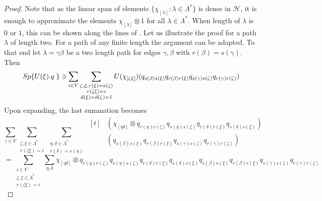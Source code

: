 \documentclass{amsart}
\theoremstyle{plain}
\theoremstyle{definition}
\theoremstyle{remark}
\numberwithin{equation}{section}
\newcommand{\cal}{\mathcal}
\newcommand{\clh}{{\cal H}}
\begin{document}
\begin{proof}
Note that as the linear span of elements $\{\chi_{[\lambda]}:\lambda\in\Lambda^{\ast}\}$ is dense in $\clh$, it is enough to approximate the elements $\chi_{[\lambda]}\otimes 1$ for all $\lambda\in\Lambda^{\ast}$. When length of $\lambda$ is $0$ or $1$, this can be shown along the lines of \cite{weber}.
 Let us illustrate the proof for a path $\lambda$ of length two. For a path of any finite length the argument can be adapted. To that end let $\lambda=\gamma\beta$ be a two length path for edges $\gamma,\beta$ with $r(\beta)=s(\gamma)$. Then 
\begin{equation*}
    {\rm Sp}\{U(\xi).q\;\}\ni  \sum\limits_{i \in V}\sum\limits_{\substack{\zeta,\xi,r(\xi)=s(\zeta) \\
    r(\zeta\xi)=i\\ d(\xi)=d(\zeta)=1}} U(\chi_{[\zeta\xi]})( q_{s(\beta)s(\xi)}q_{r(\beta)r(\xi)}q_{s(\gamma)s(\zeta)}q_{r(\gamma)r(\zeta)})
\end{equation*}
Upon expanding, the last summation becomes
\begin{equation*}
    \sum\limits_{i\in V}\sum\limits_{\substack{\zeta,\xi\in \Lambda^{\ast} \\
r(\zeta\xi)=i}}\sum\limits_{\substack{\eta,\delta\in \Lambda^{\ast} \\r(\delta)=s(\eta)}} 
\begin{aligned}[t]
&\left(\chi_{[\eta\delta]}\otimes 
q_{r(\eta)r(\zeta)}q_{s(\eta)s(\zeta)}q_{r(\delta)r(\xi)}q_{s(\delta)s(\xi)}\right) \\
&( q_{s(\beta)s(\xi)}q_{r(\beta)r(\xi)}q_{s(\gamma)s(\zeta)}q_{r(\gamma)r(\zeta)})
\end{aligned}
\end{equation*}
\begin{equation*}
    =\sum\limits_{\substack{i\in V \\ \zeta,\xi \in \Lambda^{\ast}\\
    r(\zeta\xi)=i}}\sum\limits_{\eta,\delta} \chi_{[\eta\delta]} \otimes 
q_{r(\eta)r(\zeta)}q_{s(\eta)s(\zeta)}q_{r(\delta)r(\xi)}q_{s(\delta)s(\xi)}q_{s(\beta)s(\xi)}q_{r(\beta)r(\xi)}q_{s(\gamma)s(\zeta)}q_{r(\gamma)r(\zeta)}
\end{equation*}

\end{proof}
\end{document}
